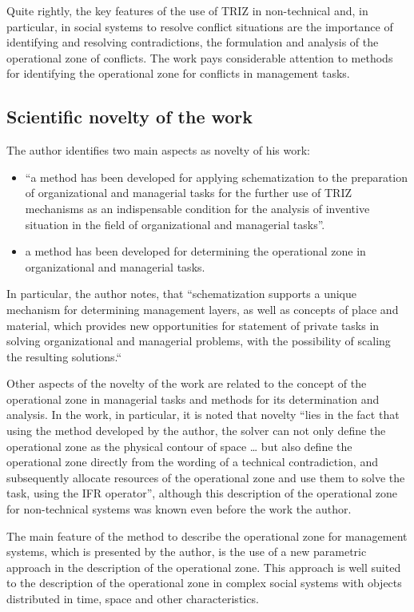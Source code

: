 \documentclass[11pt,a4paper]{article}
\begin{document}
Quite rightly, the key features of the use of TRIZ in non-technical and, in
particular, in social systems to resolve conflict situations are the
importance of identifying and resolving contradictions, the formulation and
analysis of the operational zone of conflicts. The work pays considerable
attention to methods for identifying the operational zone for conflicts in
management tasks.

\subsection*{Scientific novelty of the work}
The author identifies two main aspects as novelty of his work:
\begin{itemize}
\item “a method has been developed for applying schematization to the
  preparation of organizational and managerial tasks for the further use of
  TRIZ mechanisms as an indispensable condition for the analysis of inventive
  situation in the field of organizational and managerial tasks”.
\item a method has been developed for determining the operational zone in
  organizational and managerial tasks.
\end{itemize}
In particular, the author notes, that “schematization supports a unique
mechanism for determining management layers, as well as concepts of place and
material, which provides new opportunities for statement of private tasks in
solving organizational and managerial problems, with the possibility of
scaling the resulting solutions.“

Other aspects of the novelty of the work are related to the concept of the
operational zone in managerial tasks and methods for its determination and
analysis. In the work, in particular, it is noted that novelty “lies in the
fact that using the method developed by the author, the solver can not only
define the operational zone as the physical contour of space {\ldots} but also
define the operational zone directly from the wording of a technical
contradiction, and subsequently allocate resources of the operational zone and
use them to solve the task, using the IFR operator”, although this description
of the operational zone for non-technical systems was known even before the
work the author.

The main feature of the method to describe the operational zone for management
systems, which is presented by the author, is the use of a new parametric
approach in the description of the operational zone. This approach is well
suited to the description of the operational zone in complex social systems
with objects distributed in time, space and other characteristics.
\end{document}
